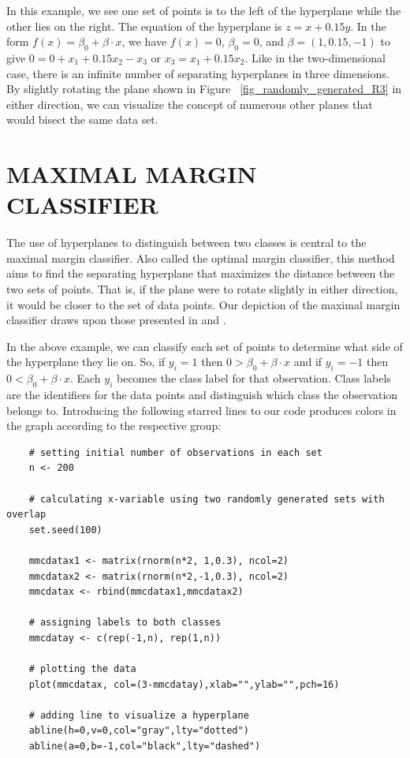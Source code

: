 \documentclass[12pt]{article}
\begin{document}
In this example, we see one set of points is to the left of the hyperplane while the other lies on the right. The equation of the hyperplane is $z = x + 0.15y$. In the form $f(x)=\beta_0 + \beta \cdot x$, we have $f(x)=0$, $\beta_0=0$, and $\beta=(1,0.15,-1)$ to give $0=0+x_1+0.15x_2-x_3$ or $x_3=x_1+0.15x_2$. Like in the two-dimensional case, there is an infinite number of separating hyperplanes in three dimensions. By slightly rotating the plane shown in Figure ~\ref{fig_randomly_generated_R3} in either direction, we can visualize the concept of numerous other planes that would bisect the same data set.

\section{MAXIMAL MARGIN CLASSIFIER}

The use of hyperplanes to distinguish between two classes is central to the maximal margin classifier. Also called the optimal margin classifier, this method aims to find the separating hyperplane that maximizes the distance between the two sets of points. That is, if the plane were to rotate slightly in either direction, it would be closer to the set of data points. Our depiction of the maximal margin classifier draws upon those presented in \cite{introstatlearning} and \cite{teitelbaum2021svmnotes}.

In the above example, we can classify each set of points to determine what side of the hyperplane they lie on. So, if $y_i=1$ then $0>\beta_0 + \beta \cdot x$ and if $y_i=-1$ then $0<\beta_0 + \beta \cdot x$. Each $y_i$ becomes the class label for that observation. Class labels are the identifiers for the data points and distinguish which class the observation belongs to. Introducing the following starred lines to our code produces colors in the graph according to the respective group:

\begin{verbatim}
    # setting initial number of observations in each set
    n <- 200
    
    # calculating x-variable using two randomly generated sets with overlap
    set.seed(100)
    
    mmcdatax1 <- matrix(rnorm(n*2, 1,0.3), ncol=2)
    mmcdatax2 <- matrix(rnorm(n*2,-1,0.3), ncol=2)
    mmcdatax <- rbind(mmcdatax1,mmcdatax2)
    
    # assigning labels to both classes
    mmcdatay <- c(rep(-1,n), rep(1,n))
    
    # plotting the data
    plot(mmcdatax, col=(3-mmcdatay),xlab="",ylab="",pch=16)
    
    # adding line to visualize a hyperplane
    abline(h=0,v=0,col="gray",lty="dotted")
    abline(a=0,b=-1,col="black",lty="dashed")    
\end{verbatim}
\end{document}
